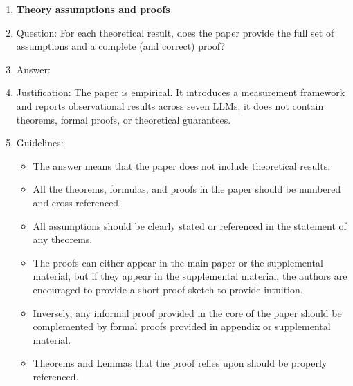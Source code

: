\begin{enumerate}
\begin{itemize}
        \item While the authors might fear that complete honesty about limitations might be used by reviewers as grounds for rejection, a worse outcome might be that reviewers discover limitations that aren't acknowledged in the paper. The authors should use their best judgment and recognize that individual actions in favor of transparency play an important role in developing norms that preserve the integrity of the community. Reviewers will be specifically instructed to not penalize honesty concerning limitations.
    \end{itemize}

\item {\bf Theory assumptions and proofs}
    \item[] Question: For each theoretical result, does the paper provide the full set of assumptions and a complete (and correct) proof?
    \item[] Answer: \answerNA{}
    \item[] Justification: The paper is empirical. It introduces a measurement framework and reports observational results across seven LLMs; it does not contain theorems, formal proofs, or theoretical guarantees.
    \item[] Guidelines:
    \begin{itemize}
        \item The answer \answerNA{} means that the paper does not include theoretical results.
        \item All the theorems, formulas, and proofs in the paper should be numbered and cross-referenced.
        \item All assumptions should be clearly stated or referenced in the statement of any theorems.
        \item The proofs can either appear in the main paper or the supplemental material, but if they appear in the supplemental material, the authors are encouraged to provide a short proof sketch to provide intuition.
        \item Inversely, any informal proof provided in the core of the paper should be complemented by formal proofs provided in appendix or supplemental material.
        \item Theorems and Lemmas that the proof relies upon should be properly referenced.
    \end{itemize}


\end{enumerate}
